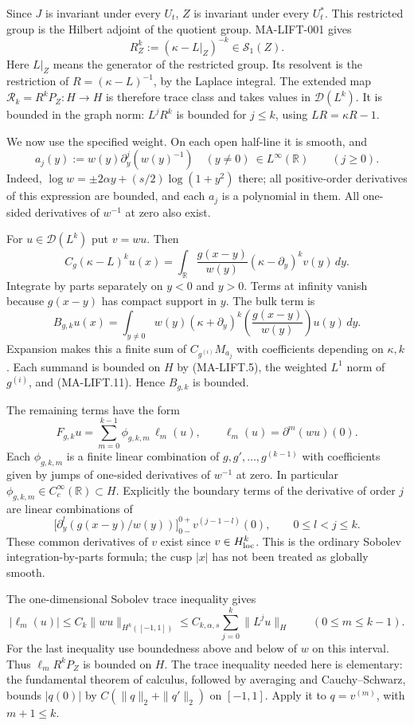Since $J$ is invariant under every $U_t$, $Z$ is invariant under
every $U_t^*$. This restricted group is the Hilbert adjoint of
the quotient group. MA-LIFT-001 gives
\[
 R_Z^k:=(\kappa-L|_Z)^{-k}\in\mathcal S_1(Z).
 \tag{MA-LIFT.10}
\]
Here $L|_Z$ means the generator of the restricted group. Its
resolvent is the restriction of $R=(\kappa-L)^{-1}$, by the
Laplace integral. The extended map
$\mathcal R_k=R^kP_Z:H\to H$ is therefore trace class and takes
values in $\mathcal D(L^k)$. It is bounded in the graph norm:
$L^jR^k$ is bounded for $j\le k$, using $LR=\kappa R-1$.

We now use the specified weight. On each open half-line it is
smooth, and
\[
 a_j(y):=w(y)\partial_y^j(w(y)^{-1})\quad(y\ne0)
       \ \in L^\infty(\mathbb R)\qquad(j\ge0).
 \tag{MA-LIFT.11}
\]
Indeed, $\log w=\pm2\alpha y+(s/2)\log(1+y^2)$ there; all
positive-order derivatives of this expression are bounded,
and each $a_j$ is a polynomial in them. All one-sided
derivatives of $w^{-1}$ at zero also exist.

For $u\in\mathcal D(L^k)$ put $v=wu$. Then
\[
 C_g(\kappa-L)^ku(x)=
 \int_{\mathbb R}\frac{g(x-y)}{w(y)}
                    (\kappa-\partial_y)^kv(y)\,dy.
 \tag{MA-LIFT.12}
\]
Integrate by parts separately on $y<0$ and $y>0$. Terms at
infinity vanish because $g(x-y)$ has compact support in $y$.
The bulk term is
\[
 B_{g,k}u(x)=\int_{y\ne0}
 w(y)(\kappa+\partial_y)^k
           \left(\frac{g(x-y)}{w(y)}\right)u(y)\,dy.
 \tag{MA-LIFT.13}
\]
Expansion makes this a finite sum of $C_{g^{(i)}}M_{a_j}$
with coefficients depending on $\kappa,k$. Each summand is
bounded on $H$ by (MA-LIFT.5), the weighted $L^1$ norm of
$g^{(i)}$, and (MA-LIFT.11). Hence $B_{g,k}$ is bounded.

The remaining terms have the form
\[
 F_{g,k}u=\sum_{m=0}^{k-1}\phi_{g,k,m}\,\ell_m(u),
 \qquad \ell_m(u)=\partial^m(wu)(0).
 \tag{MA-LIFT.14}
\]
Each $\phi_{g,k,m}$ is a finite linear combination of
$g,g',\ldots,g^{(k-1)}$ with coefficients given by jumps of
one-sided derivatives of $w^{-1}$ at zero. In particular
$\phi_{g,k,m}\in C_c^\infty(\mathbb R)\subset H$.
Explicitly the boundary terms of the derivative of order $j$
are linear combinations of
\[
 \bigl[\partial_y^l(g(x-y)/w(y))\bigr]_{0-}^{0+}
                     v^{(j-1-l)}(0),\qquad 0\le l<j\le k.
\]
These common derivatives of $v$ exist since $v\in H^k_{\rm loc}$.
This is the ordinary Sobolev integration-by-parts formula;
the cusp $|x|$ has not been treated as globally smooth.

The one-dimensional Sobolev trace inequality gives
\[
 |\ell_m(u)|\le C_k\|wu\|_{H^k([-1,1])}
 \le C_{k,\alpha,s}\sum_{j=0}^k\|L^ju\|_H
 \qquad(0\le m\le k-1).
 \tag{MA-LIFT.15}
\]
For the last inequality use boundedness above and below of $w$
on this interval. Thus $\ell_mR^kP_Z$ is bounded on $H$.
The trace inequality needed here is elementary: the fundamental
theorem of calculus, followed by averaging and Cauchy--Schwarz,
bounds $|q(0)|$ by $C(\|q\|_2+\|q'\|_2)$ on $[-1,1]$.
Apply it to $q=v^{(m)}$, with $m+1\le k$.


